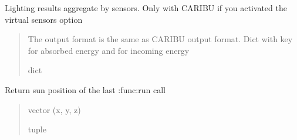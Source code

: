 \documentclass[letterpaper,10pt,english]{sphinxmanual}
\begin{document}
\begin{fulllineitems}
\begin{fulllineitems}
\begin{quote}
\begin{description}
\end{description}\end{quote}

\end{fulllineitems}


\begin{fulllineitems}
\label{\detokenize{reference:LVM.LightVegeManager.sensors_outputs}}
\pysigstartsignatures
{}
\pysigstopsignatures
\sphinxAtStartPar
Lighting results aggregate by sensors.
Only with CARIBU if you activated the virtual sensors option
\begin{quote}\begin{description}
\sphinxAtStartPar
The output format is the same as CARIBU output format. Dict with  key for absorbed energy and  for incoming energy

\sphinxAtStartPar
dict

\end{description}\end{quote}

\end{fulllineitems}


\begin{fulllineitems}
\label{\detokenize{reference:LVM.LightVegeManager.sun}}
\pysigstartsignatures
{}
\pysigstopsignatures
\sphinxAtStartPar
Return sun position of the last :func:run call
\begin{quote}\begin{description}
\sphinxAtStartPar
vector (x, y, z)

\sphinxAtStartPar
tuple

\end{description}\end{quote}

\end{fulllineitems}



\end{fulllineitems}
\end{document}
